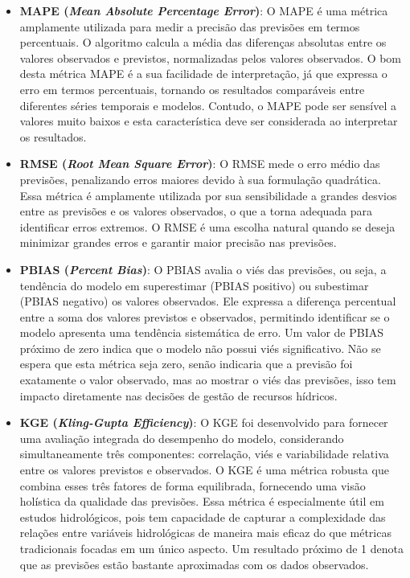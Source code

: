 \begin{itemize}
\item \textbf{MAPE (\textit{Mean Absolute Percentage Error})}: O MAPE é uma métrica amplamente utilizada para medir a precisão das previsões em termos percentuais. O algoritmo calcula a média das diferenças absolutas entre os valores observados e previstos, normalizadas pelos valores observados. O bom desta métrica MAPE é a sua facilidade de interpretação, já que expressa o erro em termos percentuais, tornando os resultados comparáveis entre diferentes séries temporais e modelos. Contudo, o MAPE pode ser sensível a valores muito baixos e esta característica deve ser considerada ao interpretar os resultados. 

\item \textbf{RMSE (\textit{Root Mean Square Error})}: O RMSE mede o erro médio das previsões, penalizando erros maiores devido à sua formulação quadrática. Essa métrica é amplamente utilizada por sua sensibilidade a grandes desvios entre as previsões e os valores observados, o que a torna adequada para identificar erros extremos. O RMSE é uma escolha natural quando se deseja minimizar grandes erros e garantir maior precisão nas previsões. 

\item \textbf{PBIAS (\textit{Percent Bias})}: O PBIAS avalia o viés das previsões, ou seja, a tendência do modelo em superestimar (PBIAS positivo) ou subestimar (PBIAS negativo) os valores observados. Ele expressa a diferença percentual entre a soma dos valores previstos e observados, permitindo identificar se o modelo apresenta uma tendência sistemática de erro. Um valor de PBIAS próximo de zero indica que o modelo não possui viés significativo. Não se espera que esta métrica seja zero, senão indicaria que a previsão foi exatamente o valor observado, mas ao mostrar o viés das previsões, isso tem impacto diretamente nas decisões de gestão de recursos hídricos. 

\item \textbf{KGE (\textit{Kling-Gupta Efficiency})}: O KGE foi desenvolvido para fornecer uma avaliação integrada do desempenho do modelo, considerando simultaneamente três componentes: correlação, viés e variabilidade relativa entre os valores previstos e observados. O KGE é uma métrica robusta que combina esses três fatores de forma equilibrada, fornecendo uma visão holística da qualidade das previsões. Essa métrica é especialmente útil em estudos hidrológicos, pois tem capacidade de capturar a complexidade das relações entre variáveis hidrológicas de maneira mais eficaz do que métricas tradicionais focadas em um único aspecto. Um resultado próximo de 1 denota que as previsões estão bastante aproximadas com os dados observados. 
\end{itemize}

